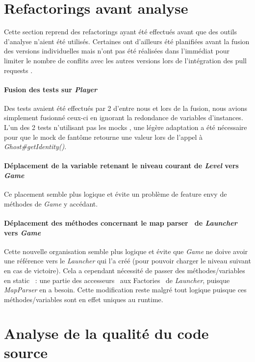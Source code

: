 \documentclass[12pt, openany]{report}
\begin{document}
\section{Refactorings avant analyse}
Cette section reprend des refactorings ayant été effectués avant que des outils d'analyse n'aient été utilisés. Certaines ont d'ailleurs été
planifiées avant la fusion des versions individuelles mais n'ont pas été réalisées dans l'immédiat pour limiter le nombre de conflits avec les autres versions lors de l'intégration des \og pull requests \fg .

\paragraph{Fusion des tests sur \textit{Player}}
Des tests avaient été effectués par 2 d’entre nous et lors de la fusion, nous avions simplement fusionné ceux-ci en ignorant la redondance de variables d’instances. L’un des 2 tests n’utilisant pas les \og mocks \fg, une légère adaptation a été nécessaire pour que le mock de fantôme retourne une valeur lors de l’appel à \mbox{\textit{Ghost\#getIdentity()}}.
\paragraph{Déplacement de la variable retenant le niveau courant de \textit{Level} vers \textit{Game}}
Ce placement semble plus logique et évite un problème de \og feature envy \fg de méthodes de \mbox{\textit{Game}} y accédant.
\paragraph{Déplacement des méthodes concernant le \og map parser \fg \, de \textit{Launcher} vers \textit{Game}}
Cette nouvelle organisation semble plus logique et évite que \mbox{\textit{Game}} ne doive avoir une référence vers le \mbox{\textit{Launcher}} qui l’a créé (pour pouvoir charger le niveau suivant en cas de victoire).
Cela a cependant nécessité de passer des méthodes/variables en \og static \fg \, : une partie des \og accesseurs \fg \, aux \og Factories \fg \, de \mbox{\textit{Launcher}}, puisque \mbox{\textit{MapParser}} en a besoin. Cette modification reste malgré tout logique puisque ces méthodes/variables sont en effet uniques au runtime.

\section{Analyse de la qualité du code source}
\end{document}
